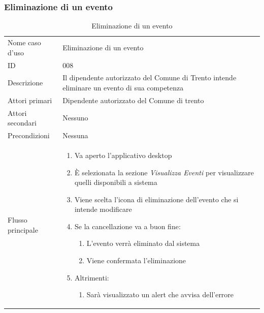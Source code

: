 \documentclass{article}
\begin{document}
\clearpage

\subsubsection{Eliminazione di un evento}

\begin{table}[htbp]
    \centering
    \begin{tabularx}{\textwidth}{| l | p{} |}
        \Xhline{2pt} %
        Nome caso d'uso & Eliminazione di un evento \\
        \Xhline{2pt} %
        ID & 008 \\
        \hline
        Descrizione & Il dipendente autorizzato del Comune di Trento intende eliminare un evento di sua competenza\\
        \hline
        Attori primari & Dipendente autorizzato del Comune di trento\\
        \hline
        Attori secondari & Nessuno \\
        \hline
        Precondizioni & Nessuna \\
        \hline
        Flusso principale & 
        \begin{enumerate}[topsep=5pt,partopsep=0pt,parsep=0pt,itemsep=0pt,before=\vspace{-\baselineskip},after=\vspace{-\baselineskip}]                
            \item Va aperto l'applicativo desktop
            \item È selezionata la sezione \textit{Visualizza Eventi} per visualizzare quelli disponibili a sistema
            \item Viene scelta l'icona di eliminazione dell'evento che si intende modificare
            \item Se la cancellazione va a buon fine:
            \begin{enumerate}[leftmargin=*, nosep]
                \item L'evento verrà eliminato dal sistema
                \item Viene confermata l'eliminazione
            \end{enumerate}
            \item Altrimenti:
            \begin{enumerate}[leftmargin=*, nosep]
                \item Sarà visualizzato un alert che avvisa dell'errore
            \end{enumerate}
        \end{enumerate}
        \\
        \hline
    \end{tabularx}
    \caption{Eliminazione di un evento}
    \label{tab:tabella_use_case008}
\end{table}
\end{document}
